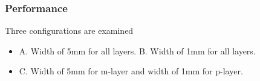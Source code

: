 \documentclass[compress]{beamer}
\begin{document}
\begin{frame}\frametitle{Performance}
\vspace{-6.5pt}
\begin{block}{Three configurations are examined}
\begin{itemize}[leftmargin=*]
\item A. Width of 5mm for all layers. \hspace{0.5cm} B. Width of 1mm for all layers. 
\item C. Width of 5mm for m-layer and width of 1mm for p-layer.
\end{itemize}
\end{block}
\end{frame}
\end{document}
